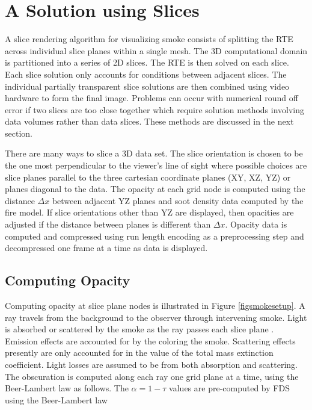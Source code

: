{\section{A Solution using Slices}
A slice rendering algorithm for visualizing smoke consists of splitting the RTE across individual slice planes within a single mesh.  The 3D computational domain is partitioned into a series of 2D slices.  The RTE is then solved on each slice.  Each slice solution only accounts for conditions between adjacent slices.  The individual partially transparent slice solutions are then combined using video hardware to form the final image.   Problems can occur with numerical round off error if two slices are too close together which require solution methods  involving data volumes rather than data slices. These methods are discussed in the next section.

There are many ways to slice a 3D data set.  The slice orientation is chosen to be the one most perpendicular to the viewer's line of sight where possible choices are slice planes parallel to the three cartesian coordinate planes (XY, XZ, YZ) or planes diagonal to the data.  The opacity at each grid node is computed using the distance $\Delta x$ between adjacent YZ planes and soot density data computed by the fire model.  If slice orientations other than YZ are displayed, then opacities are adjusted if the distance between planes is different than $\Delta x$.  Opacity data is computed and compressed using run length encoding as a preprocessing step and decompressed one frame at a time as data is displayed.


\subsection{Computing Opacity}
Computing opacity at slice plane nodes is illustrated in Figure \ref{figsmokesetup}. A ray travels from the background to the observer through intervening smoke. Light is absorbed or scattered by the smoke as the ray passes each slice plane .  Emission effects are accounted for by the coloring the smoke.  Scattering effects presently are only accounted for in the value of the total mass extinction coefficient.  Light losses are assumed to be from both absorption and scattering. The obscuration is computed along each ray one grid plane at a time, using the Beer-Lambert law as follows.  The $\alpha=1-\tau$ values are pre-computed by FDS using the Beer-Lambert law~\cite{Siegel:2001}

}
